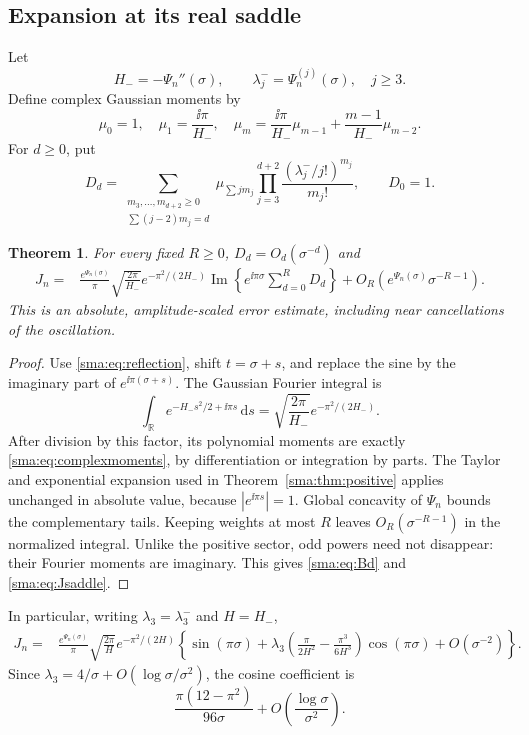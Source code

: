 \documentclass[11pt,letterpaper]{article}
\numberwithin{equation}{section}
\newtheorem{theorem}{Theorem}[section]\newtheorem{lemma}[theorem]{Lemma}\newtheorem{proposition}[theorem]{Proposition}\newtheorem{corollary}[theorem]{Corollary}\theoremstyle{remark}\newtheorem{remark}[theorem]{Remark}
\begin{document}
\subsection{Expansion at its real saddle}
Let
\[
 H_-=-\Psi_n''(\sigma),\qquad \lambda_j^-=\Psi_n^{(j)}(\sigma),\quad j\ge3.
\]
Define complex Gaussian moments by
\begin{equation}\label{sma:eq:complexmoments}
 \mu_0=1,\quad\mu_1=\frac{\ii\pi}{H_-},\quad
 \mu_m=\frac{\ii\pi}{H_-}\mu_{m-1}+\frac{m-1}{H_-}\mu_{m-2}.
\end{equation}
For $d\ge0$, put
\begin{equation}\label{sma:eq:Bd}
 D_d=\sum_{\substack{m_3,\ldots,m_{d+2}\ge0\\\sum(j-2)m_j=d}}
 \mu_{\sum j m_j}\prod_{j=3}^{d+2}\frac{(\lambda_j^-/j!)^{m_j}}{m_j!},
 \qquad D_0=1.
\end{equation}
\begin{theorem}\label{sma:thm:Jexact}
For every fixed $R\ge0$, $D_d=O_d(\sigma^{-d})$ and
\begin{align}
 J_n={}&\frac{e^{\Psi_n(\sigma)}}\pi\sqrt{\frac{2\pi}{H_-}}
 e^{-\pi^2/(2H_-)}
 \operatorname{Im}\left\{e^{\ii\pi\sigma}\sum_{d=0}^R D_d\right\}
 +O_R\!\left(e^{\Psi_n(\sigma)}\sigma^{-R-1}\right).\label{sma:eq:Jsaddle}
\end{align}
This is an absolute, amplitude-scaled error estimate, including near cancellations of the oscillation.
\end{theorem}
\begin{proof}
Use \eqref{sma:eq:reflection}, shift $t=\sigma+s$, and replace the sine by the imaginary part of $e^{\ii\pi(\sigma+s)}$. The Gaussian Fourier integral is
\[
 \int_{\mathbb R}e^{-H_-s^2/2+\ii\pi s}\,\mathrm ds
 =\sqrt{\frac{2\pi}{H_-}}e^{-\pi^2/(2H_-)}.
\]
After division by this factor, its polynomial moments are exactly \eqref{sma:eq:complexmoments}, by differentiation or integration by parts. The Taylor and exponential expansion used in Theorem~\ref{sma:thm:positive} applies unchanged in absolute value, because $|e^{\ii\pi s}|=1$. Global concavity of $\Psi_n$ bounds the complementary tails. Keeping weights at most $R$ leaves $O_R(\sigma^{-R-1})$ in the normalized integral. Unlike the positive sector, odd powers need not disappear: their Fourier moments are imaginary. This gives \eqref{sma:eq:Bd} and \eqref{sma:eq:Jsaddle}.
\end{proof}
In particular, writing $\lambda_3=\lambda_3^-$ and $H=H_-$,
\begin{align}
 J_n={}&\frac{e^{\Psi_n(\sigma)}}\pi\sqrt{\frac{2\pi}{H}}e^{-\pi^2/(2H)}
 \left\{\sin(\pi\sigma)
 +\lambda_3\left(\frac{\pi}{2H^2}-\frac{\pi^3}{6H^3}\right)\cos(\pi\sigma)
 +O(\sigma^{-2})\right\}.\label{sma:eq:Jfirst}
\end{align}
Since $\lambda_3=4/\sigma+O(\log\sigma/\sigma^2)$, the cosine coefficient is
\[
 \frac{\pi(12-\pi^2)}{96\sigma}+O\!\left(\frac{\log\sigma}{\sigma^2}\right).
\]
\end{document}
